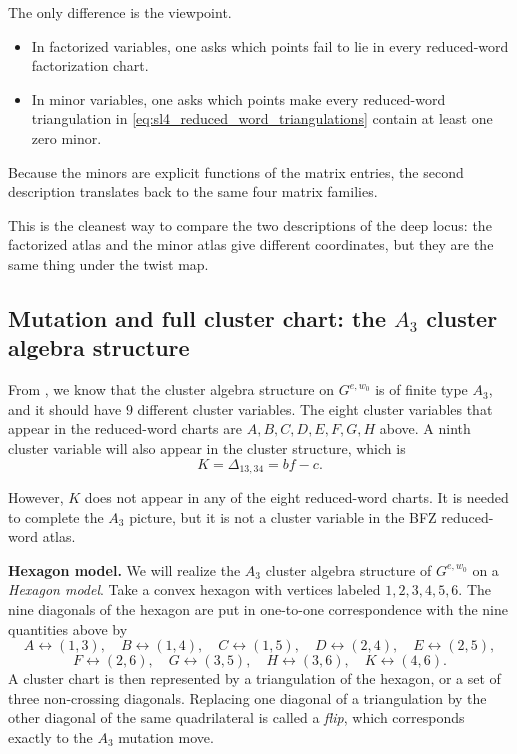 \documentclass[12pt]{amsart}
\theoremstyle{plain}
\theoremstyle{definition}
\theoremstyle{remark}
\begin{document}
The only difference is the viewpoint.
\begin{itemize}
\item In factorized variables, one asks which points fail to lie in every reduced-word factorization chart.
\item In minor variables, one asks which points make every reduced-word triangulation in \eqref{eq:sl4_reduced_word_triangulations} contain at least one zero minor.
\end{itemize}
Because the minors are explicit functions of the matrix entries, the second description translates back to the same four matrix families.

This is the cleanest way to compare the two descriptions of the deep locus: the factorized atlas and the minor atlas give different coordinates, but they are the same thing under the twist map. 


\subsection{Mutation and full cluster chart: the \texorpdfstring{$A_3$}{A3} cluster algebra structure}
From \cite{BFZ05}, we know that the cluster algebra structure on $G^{e,w_0}$ is of finite type $A_3$, and it should have $9$ different cluster variables.  The eight cluster variables that appear in the reduced-word charts are $A,B,C,D,E,F,G,H$ above. A ninth cluster variable will also appear in the cluster structure, which is 
\[
K=\Delta_{13,34}=bf-c.
\]

However, $K$ does not appear in any of the eight reduced-word charts.  It is needed to complete the $A_3$ picture, but it is not a cluster variable in the BFZ reduced-word atlas.


\medskip
\noindent
\textbf{Hexagon model.}
We will realize the $A_3$ cluster algebra structure of $G^{e,w_0}$ on a \emph{Hexagon model}. Take a convex hexagon with vertices labeled $1,2,3,4,5,6$.  The nine diagonals of the hexagon are put in one-to-one correspondence with the nine quantities above by
\[
A\leftrightarrow (1,3),\quad
B\leftrightarrow (1,4),\quad
C\leftrightarrow (1,5),\quad
D\leftrightarrow (2,4),\quad
E\leftrightarrow (2,5),
\]
\[
F\leftrightarrow (2,6),\quad
G\leftrightarrow (3,5),\quad
H\leftrightarrow (3,6),\quad
K\leftrightarrow (4,6).
\]
A cluster chart is then represented by a triangulation of the hexagon, or a set of three non-crossing diagonals.  Replacing one diagonal of a triangulation by the other diagonal of the same quadrilateral is called a \emph{flip}, which corresponds exactly to the $A_3$ mutation move.
\end{document}
